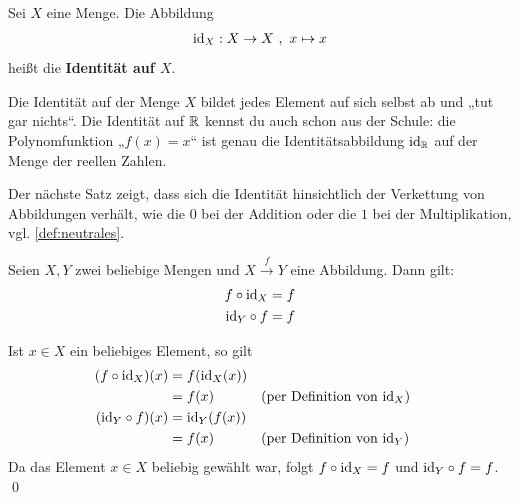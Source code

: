 \begin{de}[Identitätsabbildung] 
    Sei $X$ eine Menge. Die Abbildung
    \begin{align*}
        \mathrm{id}_X: X \to X \ ,\ x \mapsto x
    \end{align*}
    heißt die \textbf{Identität auf $X$}.
\end{de}


\begin{bem}
    Die Identität auf der Menge $X$ bildet jedes Element auf sich selbst ab und „tut gar nichts“. Die Identität auf $\mathbb R$ kennst du auch schon aus der Schule: die Polynomfunktion „$f(x)=x$“ ist genau die Identitätsabbildung $\mathrm{id}_\mathbb R$ auf der Menge der reellen Zahlen.
\end{bem}


\noindent Der nächste Satz zeigt, dass sich die Identität hinsichtlich der Verkettung von Abbildungen verhält, wie die $0$ bei der Addition oder die $1$ bei der Multiplikation, vgl. \cref{def:neutrales}.


\begin{satz} \label{idneutral}
    Seien $X,Y$ zwei beliebige Mengen und $X\xrightarrow{f} Y$ eine Abbildung. Dann gilt:
    \begin{align*}
        f\circ \mathrm{id}_X & = f \\
        \mathrm{id}_Y \circ f & = f
    \end{align*}
\end{satz}


\begin{bew}
    Ist $x \in X$ ein beliebiges Element, so gilt
    \begin{align*}
        (f\circ \mathrm{id}_X)(x) & = f(\mathrm{id}_X(x)) \\
        & =f(x) && (\text{per Definition von $\mathrm{id}_X$}) \\
        (\mathrm{id}_Y \circ f)(x) & =\mathrm{id}_Y(f(x)) \\
        & = f(x)&& (\text{per Definition von $\mathrm{id}_Y$})
    \end{align*}
    Da das Element $x\in X$ beliebig gewählt war, folgt $f\circ \mathrm{id}_X=f$ und $\mathrm{id}_Y\circ f=f$. \qed
\end{bew}


